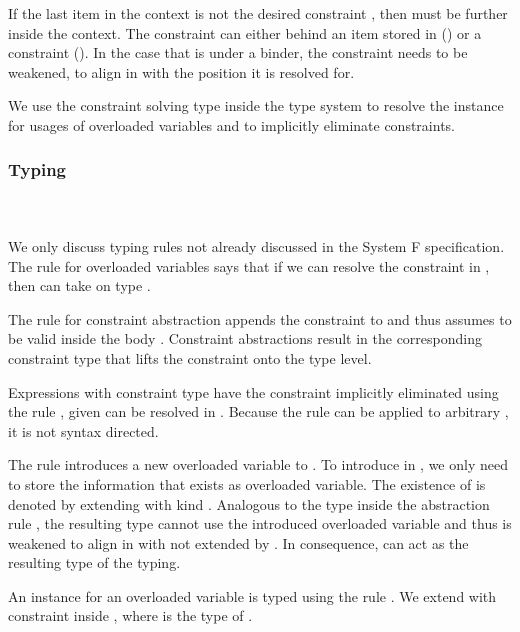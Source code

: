 \noindent If the last item in the context is not the desired constraint , then  must be further inside the context. The constraint can either behind an item stored in  () or a constraint (). In the case that  is under a binder, the constraint needs to be weakened, to align in  with the position it is resolved for.

\noindent We use the constraint solving type inside the type system to resolve the instance for usages of overloaded variables and to implicitly eliminate constraints.

\subsubsection{Typing}\hfill\\\\
We only discuss typing rules not already discussed in the System F specification. 
\FoTyping
The rule for overloaded variables  says that if we can resolve the constraint  \Constr{:}  in , then  can take on type . 

\noindent The rule for constraint abstraction  appends the constraint  to  and thus assumes  to be valid inside the body . Constraint abstractions result in the corresponding constraint type \Constr{[}  \Constr{]⇒}  that lifts the constraint onto the type level.

\noindent Expressions  with constraint type \Constr{[}  \Constr{]⇒}  have the constraint implicitly eliminated using the rule , given  can be resolved in . Because the rule can be applied to arbitrary , it is not syntax directed.

\noindent The rule  introduces a new overloaded variable  to . 
To introduce  in , we only need to store the information that  exists as overloaded variable. The existence of  is denoted by extending  with kind .
Analogous to the type  inside the abstraction rule , the resulting type  cannot use the introduced overloaded variable and thus is weakened to align in  with  not extended by . In consequence,  can act as the resulting type of the typing.

\noindent An instance for an overloaded variable  is typed using the rule . We extend  with constraint  \Constr{:}  inside , where  is the type of . 


